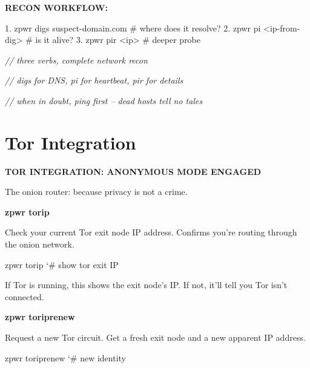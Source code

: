 \documentclass[11pt,a4paper,twoside]{book}
\begin{document}
\vspace{12pt}
{\bfseries\color{neonyellow} RECON WORKFLOW:}\vspace{4pt}

1. zpwr digs suspect-domain.com  \# where does it resolve? 2. zpwr pi <ip-from-dig>         \# is it alive? 3. zpwr pir <ip>                 \# deeper probe

{\small\itshape\color{dimtext} // three verbs, complete network recon}

{\small\itshape\color{dimtext} // digs for DNS, pi for heartbeat, pir for details}

{\small\itshape\color{dimtext} // when in doubt, ping first -- dead hosts tell no tales}


\vspace{16pt}

\section{Tor Integration}


\vspace{10pt}
{\large\bfseries\color{neoncyan} TOR INTEGRATION: ANONYMOUS MODE ENGAGED}\vspace{6pt}

The onion router: because privacy is not a crime.


\vspace{12pt}
{\bfseries\color{neonyellow} zpwr torip}\vspace{4pt}

Check your current Tor exit node IP address. Confirms you're routing through the onion network.

\begin{codebox}
\color{neongreen}zpwr torip                  {\char`\#} show tor exit IP\\
\end{codebox}

If Tor is running, this shows the exit node's IP. If not, it'll tell you Tor isn't connected.


\vspace{12pt}
{\bfseries\color{neonyellow} zpwr toriprenew}\vspace{4pt}

Request a new Tor circuit. Get a fresh exit node and a new apparent IP address.

\begin{codebox}
\color{neongreen}zpwr toriprenew             {\char`\#} new identity\\
\end{codebox}
\end{document}
